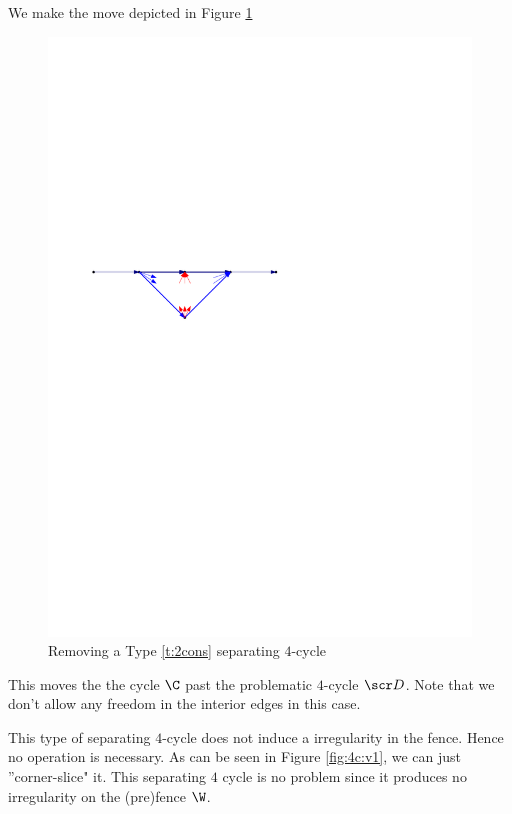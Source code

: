   We make the move depicted in Figure \ref{fig:4c:cycle_b}
  \begin{figure}[h]
    \centering
    \includegraphics[scale=1]{4cycles/img/cycle_b}
    \caption{Removing a Type \ref{t:2cons} separating $4$-cycle}
    \label{fig:4c:cycle_b}
  \end{figure}

  This moves the the cycle $\C$ past the problematic $4$-cycle $\D$. Note that we don't allow any freedom in the interior edges in this case.

  This type of separating $4$-cycle does not induce a irregularity in the fence. Hence no operation is necessary.
  As can be seen in Figure \ref{fig:4c:v1}, we can just ''corner-slice" it. This separating $4$ cycle is no problem since it produces no irregularity on the (pre)fence $\W$.

